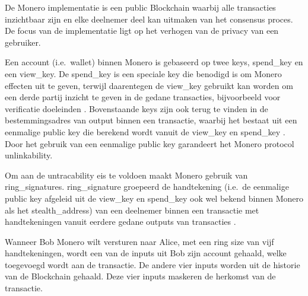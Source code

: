 De Monero implementatie is een public Blockchain waarbij alle transacties inzichtbaar zijn en elke deelnemer deel kan uitmaken van het consensus proces. De focus van de implementatie ligt op het verhogen van de privacy van een gebruiker. 

Een account (i.e.\ \gls{wallet}) binnen Monero is gebaseerd op twee keys, \gls{spend_key} en een \gls{view_key}. De \gls{spend_key} is een speciale key die benodigd is om Monero effecten uit te geven, terwijl daarentegen de \gls{view_key} gebruikt kan worden om een derde partij inzicht te geven in de gedane transacties, bijvoorbeeld voor verificatie doeleinden \citep[''Account'']{moneropedia}. Bovenstaande keys zijn ook terug te vinden in de bestemmingsadres van output binnen een transactie, waarbij het bestaat uit een eenmalige public key die berekend wordt vanuit de \gls{view_key} en \gls{spend_key} \citep[''Transaction'']{moneropedia}. Door het gebruik van een eenmalige public key garandeert het Monero protocol unlinkability.

Om aan de untracability eis te voldoen maakt Monero gebruik van \glspl{ring_signature}. \Gls{ring_signature} groepeerd de handtekening (i.e.\ de eenmalige public key afgeleid uit de \gls{view_key} en \gls{spend_key} ook wel bekend binnen Monero als het \gls{stealth_address}) van een deelnemer binnen een transactie met handtekeningen vanuit eerdere gedane outputs van transacties \citep[''Ring Signature'']{moneropedia}.

Wanneer Bob Monero wilt versturen naar Alice, met een ring size van vijf handtekeningen, wordt een van de inputs uit Bob zijn account gehaald, welke toegevoegd wordt aan de transactie. De andere vier inputs worden uit de historie van de Blockchain gehaald. Deze vier inputs maskeren de herkomst van de transactie.

